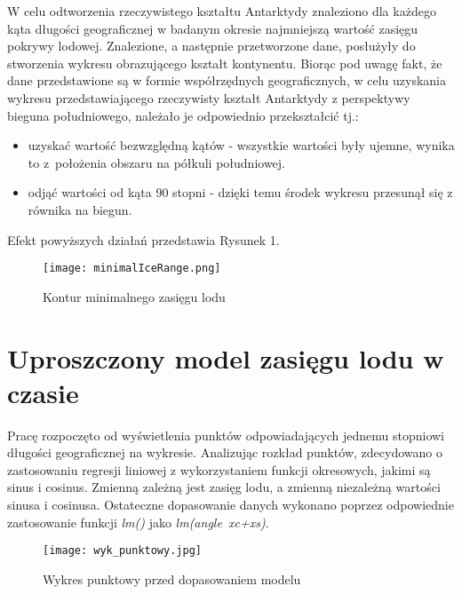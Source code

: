 \documentclass[letterpaper,12pt]{article}
\begin{document}
W celu odtworzenia rzeczywistego kształtu Antarktydy znaleziono dla każdego kąta długości geograficznej w badanym okresie najmniejszą wartość zasięgu pokrywy lodowej. Znalezione, a następnie przetworzone dane, posłużyły do stworzenia wykresu obrazującego kształt kontynentu. \newline Biorąc pod uwagę fakt, że dane przedstawione są w formie współrzędnych geograficznych, w celu uzyskania wykresu przedstawiającego rzeczywisty kształt Antarktydy z perspektywy bieguna południowego, należało je odpowiednio przekształcić tj.:
\begin{itemize}
  \item uzyskać wartość bezwzględną kątów - wszystkie wartości były ujemne, wynika to z~położenia obszaru na półkuli południowej.
  \item odjąć wartości od kąta 90 stopni - dzięki temu środek wykresu przesunął się z równika na biegun.
\end{itemize}

Efekt powyższych działań przedstawia Rysunek 1.

\begin{figure}[ht]
        \centering \texttt{[image: minimalIceRange.png]}
        \caption{
                \label{fig:samplesetup}
                Kontur minimalnego zasięgu lodu
        }
\end{figure}

\section{Uproszczony model zasięgu lodu w czasie}
Pracę rozpoczęto od wyświetlenia punktów odpowiadających jednemu stopniowi długości geograficznej na wykresie. Analizując rozkład punktów, zdecydowano o zastosowaniu regresji liniowej z wykorzystaniem funkcji okresowych, jakimi są sinus i cosinus. Zmienną zależną jest zasięg lodu, a zmienną niezależną wartości sinusa i cosinusa. Ostateczne dopasowanie danych wykonano poprzez odpowiednie zastosowanie funkcji \textit{lm()} jako \textit{lm(angle~xc+xs)}.



\newpage
\begin{figure}[ht]
        \centering \texttt{[image: wyk\_punktowy.jpg]}
        \caption{
                \label{fig:samplesetup}
                Wykres punktowy przed dopasowaniem modelu
        }
\end{figure}
\end{document}
